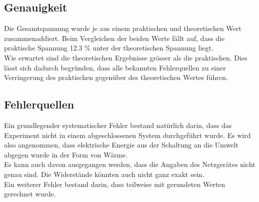 \documentclass[a4paper,12pt]{article}
\begin{document}
\subsection{Genauigkeit}

Die Gesamtspannung wurde je aus einem praktischen und theoretischen Wert zusammenaddiert. Beim Vergleichen der beiden Werte fällt auf, dass die praktische Spannung 12.3 \% unter der theoretischen Spannung liegt.\\

Wie erwartet sind die theoretischen Ergebnisse grösser als die praktischen. Dies lässt sich dadurch begründen, dass alle bekannten Fehlerquellen zu einer Verringerung des praktischen gegenüber des theoretischen Wertes führen.





\subsection{Fehlerquellen}

Ein grundlegender systematischer Fehler bestand natürlich darin, dass das Experiment nicht in einem abgeschlossenen System durchgeführt wurde. Es wird also angenommen, dass elektrische Energie aus der Schaltung an die Umwelt abgegen wurde in der Form von Wärme.\\

Es kann auch davon ausgegangen werden, dass die Angaben des Netzgerätes nicht genau sind. Die Widerstände könnten auch nicht ganz exakt sein.\\

Ein weiterer Fehler bestand darin, dass teilweise mit gerundeten Werten gerechnet wurde.\\

\end{document}
